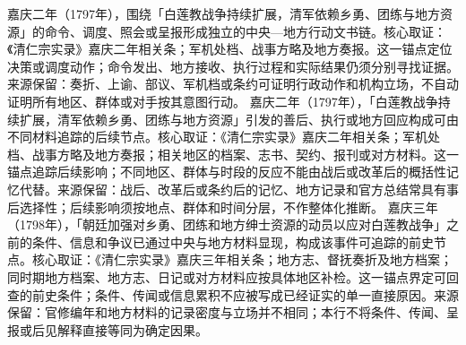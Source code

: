 嘉庆二年（1797年），围绕「白莲教战争持续扩展，清军依赖乡勇、团练与地方资源」的命令、调度、照会或呈报形成独立的中央—地方行动文书链。核心取证：《清仁宗实录》嘉庆二年相关条；军机处档、战事方略及地方奏报。这一锚点定位决策或调度动作；命令发出、地方接收、执行过程和实际结果仍须分别寻找证据。来源保留：奏折、上谕、部议、军机档或条约可证明行政动作和机构立场，不自动证明所有地区、群体或对手按其意图行动。
嘉庆二年（1797年），「白莲教战争持续扩展，清军依赖乡勇、团练与地方资源」引发的善后、执行或地方回应构成可由不同材料追踪的后续节点。核心取证：《清仁宗实录》嘉庆二年相关条；军机处档、战事方略及地方奏报；相关地区的档案、志书、契约、报刊或对方材料。这一锚点追踪后续影响；不同地区、群体与时段的反应不能由战后或改革后的概括性记忆代替。来源保留：战后、改革后或条约后的记忆、地方记录和官方总结常具有事后选择性；后续影响须按地点、群体和时间分层，不作整体化推断。
嘉庆三年（1798年），「朝廷加强对乡勇、团练和地方绅士资源的动员以应对白莲教战争」之前的条件、信息和争议已通过中央与地方材料显现，构成该事件可追踪的前史节点。核心取证：《清仁宗实录》嘉庆三年相关条；地方志、督抚奏折及地方档案；同时期地方档案、地方志、日记或对方材料应按具体地区补检。这一锚点界定可回查的前史条件；条件、传闻或信息累积不应被写成已经证实的单一直接原因。来源保留：官修编年和地方材料的记录密度与立场并不相同；本行不将条件、传闻、呈报或后见解释直接等同为确定因果。
